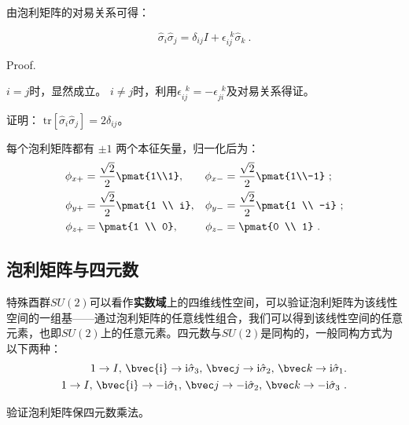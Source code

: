 由泡利矩阵的对易关系可得：
\begin{theorem}{}
\begin{equation}\label{eq_pauliM_1}
\hat{\sigma}_i\hat{\sigma}_j = \delta_{ij}I + \epsilon ^{\,\,\, k}_{ij}\hat{\sigma}_k~.
\end{equation}
\end{theorem}
Proof.

$i=j$时，显然成立。
$i\neq j$时，利用$\epsilon ^{\,\,\, k}_{ij}=-\epsilon ^{\,\,\, k}_{ji}$及对易关系得证。


\begin{exercise}{}
证明：
$\mathrm{tr}[\hat{\sigma}_i \hat{\sigma}_j]= 2\delta_{ij}$。
\end{exercise}

每个泡利矩阵都有 $\pm 1$ 两个本征矢量，归一化后为：
\begin{equation}
\begin{aligned}
\phi_{x+} &= \frac{\sqrt 2}{2}\pmat{1\\1}, &\phi_{x-} &= \frac{\sqrt 2}{2} \pmat{1\\-1}~;\\
\phi_{y+} &= \frac{\sqrt 2}{2}\pmat{1 \\ i}, &\phi_{y-} &= \frac{\sqrt 2}{2} \pmat{1 \\ -i} ~;\\
\phi_{z+} &= \pmat{1 \\ 0}, &\phi_{z-} &= \pmat{0 \\ 1}~.
\end{aligned}
\end{equation}

\subsection{泡利矩阵与四元数}
特殊酉群$SU(2)$可以看作\textbf{实数域}上的四维线性空间，可以验证泡利矩阵为该线性空间的一组基——通过泡利矩阵的任意线性组合，我们可以得到该线性空间的任意元素，也即$SU(2)$上的任意元素。四元数与$SU(2)$是同构的，一般同构方式为以下两种：
\begin{equation}
\begin{aligned}
1\rightarrow I,\,\bvec{\mathrm i}\rightarrow \mathrm i \hat{\sigma}_3,\,\bvec j\rightarrow \mathrm i\hat{\sigma}_2,\,\bvec k\rightarrow \mathrm i\hat{\sigma}_1.\\
1\rightarrow I,\,\bvec{\mathrm i}\rightarrow -\mathrm i\hat{\sigma}_1,\,\bvec j\rightarrow -\mathrm i\hat{\sigma}_2,\,\bvec k\rightarrow -\mathrm i\hat{\sigma}_3~.
\end{aligned}
\end{equation}

\begin{exercise}{}
验证泡利矩阵保四元数乘法。
\end{exercise}